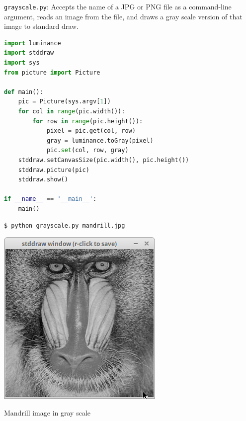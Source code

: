 \documentclass[8pt,a4paper,compress,handout]{beamer}
\begin{document}
\begin{frame}[fragile]
\begin{framed}
\tiny \lstinline{grayscale.py}: Accepts the name of a JPG or PNG file as a command-line argument, reads an image from the file, and draws a gray scale version of that image to standard draw.
\end{framed}

\begin{lstlisting}[language=Python]
import luminance
import stddraw
import sys
from picture import Picture

def main():
    pic = Picture(sys.argv[1])
    for col in range(pic.width()):
        for row in range(pic.height()):
            pixel = pic.get(col, row)
            gray = luminance.toGray(pixel)
            pic.set(col, row, gray)
    stddraw.setCanvasSize(pic.width(), pic.height())
    stddraw.picture(pic)
    stddraw.show()

if __name__ == '__main__':
    main()
\end{lstlisting}

\begin{minipage}{200pt}
\begin{lstlisting}[language={}]
$ python grayscale.py mandrill.jpg
\end{lstlisting}
\end{minipage}%
\hfill
\begin{minipage}{100pt}
\begin{center}
\includegraphics[scale=0.2]{figures/grayscale.png}

\smallskip

\tiny Mandrill image in gray scale
\end{center}
\end{minipage}
\end{frame}
\end{document}
